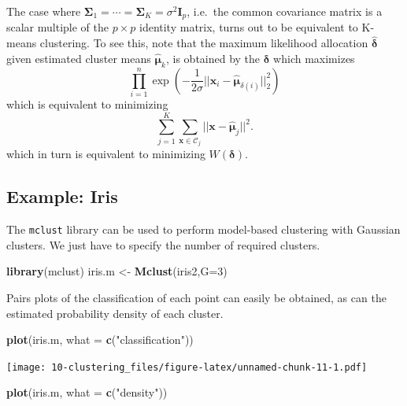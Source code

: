 \documentclass[
]{book}
\newenvironment{Shaded}{\begin{snugshade}}{\end{snugshade}}
\newcommand{\AttributeTok}[1]{\textcolor[rgb]{0.13,0.29,0.53}{#1}}
\newcommand{\DecValTok}[1]{\textcolor[rgb]{0.00,0.00,0.81}{#1}}
\newcommand{\FunctionTok}[1]{\textcolor[rgb]{0.13,0.29,0.53}{\textbf{#1}}}
\newcommand{\NormalTok}[1]{#1}
\newcommand{\OtherTok}[1]{\textcolor[rgb]{0.56,0.35,0.01}{#1}}
\newcommand{\StringTok}[1]{\textcolor[rgb]{0.31,0.60,0.02}{#1}}
\theoremstyle{definition}
\theoremstyle{definition}
\theoremstyle{definition}
\theoremstyle{definition}
\theoremstyle{remark}
\begin{document}
The case where \(\boldsymbol{\Sigma}_1=\cdots = \boldsymbol{\Sigma}_K=\sigma^2 \mathbf I_p\), i.e.~the common covariance matrix is a scalar multiple of the \(p \times p\) identity matrix, turns out to be equivalent to K-means clustering. To see this, note that the maximum likelihood allocation \(\hat{\boldsymbol \delta}\) given estimated cluster means \(\hat{{\boldsymbol{\mu}}}_k\), is obtained by the \(\boldsymbol \delta\) which maximizes
\[
\prod_{i=1}^n\exp(-\frac{1}{2\sigma}||\mathbf x_i-\hat{{\boldsymbol{\mu}}}_{\delta(i)}||_2^2)
\]
which is equivalent to minimizing
\[
\sum_{j=1}^K \sum_{\mathbf x\in \mathcal{C}_j} \vert \vert \mathbf x- \hat{{\boldsymbol{\mu}}}_j\vert \vert^2.
\]
which in turn is equivalent to minimizing \(W(\boldsymbol \delta)\).

\subsection{Example: Iris}\label{example-iris-1}

The \texttt{mclust} library can be used to perform model-based clustering with Gaussian clusters. We just have to specify the number of required clusters.

\begin{Shaded}
\begin{Highlighting}[]
\FunctionTok{library}\NormalTok{(mclust)}
\NormalTok{iris.m }\OtherTok{\textless{}{-}} \FunctionTok{Mclust}\NormalTok{(iris2,}\AttributeTok{G=}\DecValTok{3}\NormalTok{)}
\end{Highlighting}
\end{Shaded}

Pairs plots of the classification of each point can easily be obtained, as can the estimated probability density of each cluster.

\begin{Shaded}
\begin{Highlighting}[]
\FunctionTok{plot}\NormalTok{(iris.m, }\AttributeTok{what =} \FunctionTok{c}\NormalTok{(}\StringTok{"classification"}\NormalTok{))}
\end{Highlighting}
\end{Shaded}

\texttt{[image: 10-clustering\_files/figure-latex/unnamed-chunk-11-1.pdf]}

\begin{Shaded}
\begin{Highlighting}[]
\FunctionTok{plot}\NormalTok{(iris.m, }\AttributeTok{what =} \FunctionTok{c}\NormalTok{(}\StringTok{"density"}\NormalTok{))}
\end{Highlighting}
\end{Shaded}
\end{document}
